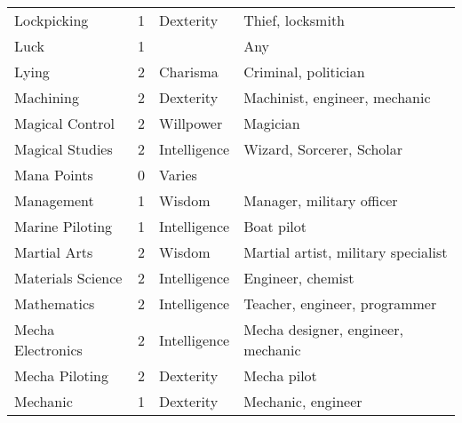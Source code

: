 \documentclass[twoside]{book}
\begin{document}
\begin{longtable}{p{1.25in}llp{12em}}
  \raggedright
           Lockpicking 
  &
   1 
  &
   Dexterity 
  &
   Thief, locksmith 
  \tabularnewline
      
  \raggedright
           Luck 
  &
   1 
  &
    
  &
   Any 
  \tabularnewline
      
  \raggedright
           Lying 
  &
   2 
  &
   Charisma 
  &
   Criminal, politician
           
  \tabularnewline
      
  \raggedright
           Machining 
  &
   2 
  &
   Dexterity 
  &
   Machinist, engineer,
           mechanic 
  \tabularnewline
      
  \raggedright
           Magical Control 
  &
   2 
  &
   Willpower 
  &
   Magician 
  \tabularnewline
      
  \raggedright
           Magical Studies 
  &
   2 
  &
   Intelligence 
  &
   Wizard, Sorcerer, Scholar
           
  \tabularnewline
      
  \raggedright
           Mana Points 
  &
   0 
  &
   Varies 
  &
  
  \tabularnewline
      
  \raggedright
           Management 
  &
   1 
  &
   Wisdom 
  &
   Manager, military officer
           
  \tabularnewline
      
  \raggedright
           Marine Piloting 
  &
   1 
  &
   Intelligence 
  &
   Boat pilot 
  \tabularnewline
      
  \raggedright
           Martial Arts 
  &
   2 
  &
   Wisdom 
  &
   Martial artist, military
           specialist 
  \tabularnewline
      
  \raggedright
           Materials Science 
  &
   2 
  &
   Intelligence 
  &
   Engineer, chemist
           
  \tabularnewline
      
  \raggedright
           Mathematics 
  &
   2 
  &
   Intelligence 
  &
   Teacher, engineer,
           programmer 
  \tabularnewline
      
  \raggedright
           Mecha Electronics 
  &
   2 
  &
   Intelligence 
  &
   Mecha designer, engineer,
           mechanic 
  \tabularnewline
      
  \raggedright
           Mecha Piloting 
  &
   2 
  &
   Dexterity 
  &
   Mecha pilot 
  \tabularnewline
      
  \raggedright
           Mechanic 
  &
   1 
  &
   Dexterity 
  &
   Mechanic, engineer
           

\end{longtable}
\end{document}
